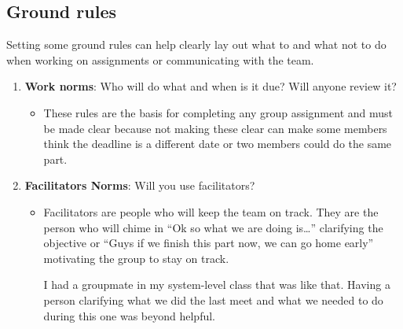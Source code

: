 \documentclass[
10pt, %
letterpaper, %
oneside, %
headinclude,footinclude, %
BCOR5mm, %
]{scrartcl}
\begin{document}
\subsection{Ground rules}

Setting some ground rules can help clearly lay out what to and what not
to do when working on assignments or communicating with the team.

\begin{enumerate}
\item
  \textbf{Work norms}: Who will do what and when is it due? Will anyone
  review it?
\begin{itemize}
\item
  These rules are the basis for completing any group assignment and must
  be made clear because not making these clear can make some members
  think the deadline is a different date or two members could do the
  same part.
\end{itemize}
\item
  \textbf{Facilitators Norms}: Will you use facilitators?
\begin{itemize}
\item
  Facilitators are people who will keep the team on track. They are the
  person who will chime in ``Ok so what we are doing is\ldots{}''
  clarifying the objective or ``Guys if we finish this part now, we can
  go home early'' motivating the group to stay on track.

  I had a groupmate in my system-level class that was like that. Having
  a person clarifying what we did the last meet and what we needed to do
  during this one was beyond helpful.


\end{itemize}
\end{enumerate}
\end{document}
